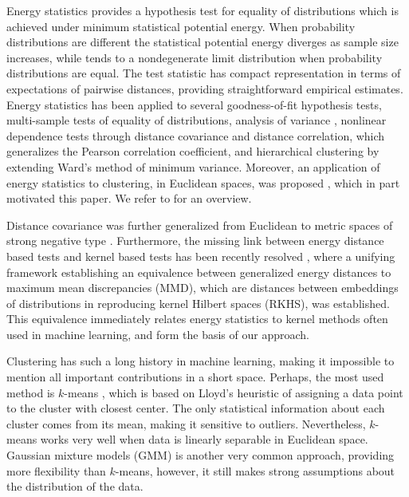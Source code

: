 \documentclass[twoside]{article}
\begin{document}
Energy statistics \citep{Szkely2013}
provides a hypothesis test for equality of 
distributions which is achieved 
under minimum statistical potential energy. 
When probability distributions are different the 
statistical potential energy diverges as sample size increases, while tends 
to a nondegenerate limit distribution when probability
distributions are equal. 
The test statistic has compact representation
in terms of expectations of pairwise distances, providing
straightforward empirical estimates. Energy statistics
has been applied to several goodness-of-fit 
hypothesis tests, multi-sample tests of equality of distributions, 
analysis of variance \citep{RizzoVariance}, nonlinear dependence tests through
distance covariance and distance correlation, which generalizes the Pearson
correlation coefficient, and hierarchical clustering \citep{RizzoClustering} 
by extending Ward's method of minimum variance. Moreover, an application of 
energy statistics to clustering, in Euclidean spaces, was 
proposed \citep{Kgroups}, which in part motivated this paper. 
We refer to \citep{Szkely2013} for an overview.

Distance covariance was further generalized from Euclidean 
to metric spaces of strong negative type \citep{Lyons}. Furthermore, 
the missing link between energy distance based tests and kernel 
based tests has 
been recently resolved \citep{Sejdinovic2013}, where a unifying framework
establishing an equivalence between generalized energy distances to maximum
mean discrepancies (MMD), which are distances between embeddings of 
distributions in reproducing kernel Hilbert spaces (RKHS), was established. 
This equivalence immediately relates energy statistics to
kernel methods often used in machine learning, and form the basis 
of our approach.

Clustering has such a long history in machine learning, making it
impossible to mention all important contributions in a short space. 
Perhaps, the most used method is $k$-means \citep{Lloyd,MacQueen,Forgy}, which
is based on Lloyd's heuristic \citep{Lloyd} of assigning a data point to
the cluster with closest center. The only statistical 
information about each cluster comes from its mean, making it sensitive 
to outliers. Nevertheless, $k$-means works very well when data is 
linearly separable in Euclidean space. Gaussian mixture models (GMM) is 
another very common approach, providing more flexibility than $k$-means, 
however, it still makes strong assumptions about the distribution of 
the data.
\end{document}
